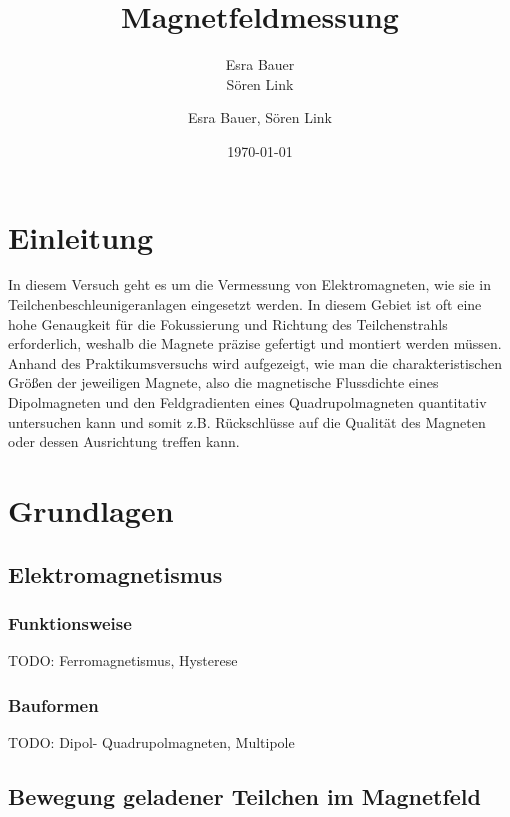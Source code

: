 \documentclass[bigchapter,colorback,accentcolor=tud4b,linedtoc,11pt]{tudreport}
\title{Magnetfeldmessung}
\subtitle{Esra Bauer  \\Sören Link}
\author{Esra Bauer, Sören Link}
\date{\today}
\begin{document}

\maketitle

\tableofcontents


\chapter{Einleitung}

In diesem Versuch geht es um die Vermessung von Elektromagneten, wie sie in Teilchenbeschleunigeranlagen eingesetzt werden. In diesem Gebiet ist oft eine hohe Genaugkeit für die Fokussierung und Richtung des Teilchenstrahls erforderlich, weshalb die Magnete präzise gefertigt und montiert werden müssen. Anhand  des Praktikumsversuchs wird aufgezeigt, wie man die charakteristischen Größen der jeweiligen Magnete, also die magnetische Flussdichte eines Dipolmagneten und den Feldgradienten eines Quadrupolmagneten quantitativ untersuchen kann und somit z.B. Rückschlüsse auf die Qualität des Magneten oder dessen Ausrichtung treffen kann.

\chapter{Grundlagen}
\section{Elektromagnetismus}


\subsection{Funktionsweise}

TODO: Ferromagnetismus, Hysterese

\subsection{Bauformen}

TODO: Dipol- Quadrupolmagneten, Multipole

\section{Bewegung geladener Teilchen im Magnetfeld}
\end{document}
